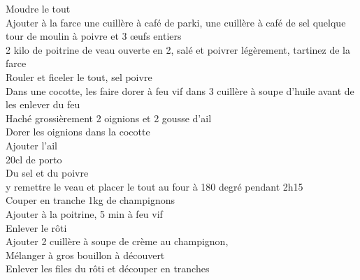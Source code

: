 \begin{minipage}[c]{\textwidth}
Moudre le tout\\
Ajouter à la farce une cuillère à café de parki, une cuillère à café de sel quelque tour de moulin à poivre et 3 œufs entiers\\
2 kilo de poitrine de veau ouverte en 2, salé et poivrer légèrement, tartinez de la farce\\
Rouler et ficeler le tout, sel poivre\\
Dans une cocotte, les faire dorer à feu vif dans 3 cuillère à soupe d'huile avant de les enlever du feu\\
Haché grossièrement 2 oignions et 2 gousse d'ail\\
Dorer les oignions dans la cocotte\\
Ajouter l'ail\\
20cl de porto\\
Du sel et du poivre\\
y remettre le veau et placer le tout au four à 180 degré pendant 2h15\\
Couper en tranche 1kg de champignons\\
Ajouter à la poitrine, 5 min à feu vif\\
Enlever le rôti\\
Ajouter 2 cuillère à soupe de crème au champignon,\\
Mélanger à gros bouillon à découvert\\
Enlever les files du rôti et découper en tranches\\
\\

\end{minipage}


